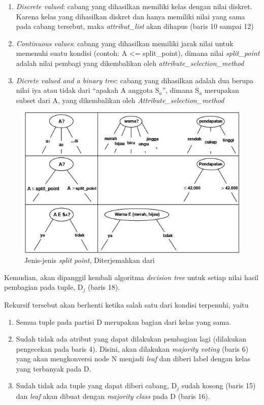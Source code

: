 \begin{enumerate}
	\item \textsl{Discrete valued}: cabang yang dihasilkan memiliki kelas dengan nilai diskret. Karena kelas yang dihasilkan diskret dan hanya memiliki nilai yang sama pada cabang tersebut, maka \textsl{attribut\_list} akan dihapus (baris 10 sampai 12)
	\item \textsl{Continuous values}: cabang yang dihasilkan memiliki jarak nilai untuk memenuhi suatu kondisi (contoh: A <= split\_point), dimana nilai \textsl{split\_point} adalah nilai pembagi yang dikembalikan oleh \textsl{attribute\_selection\_method}
	\item \textsl{Dicrete valued and a binary tree}: cabang yang dihasilkan adalah dua berupa nilai iya atau tidak dari "`apakah A anggota S$_{a}$"', dimana S$_{a}$ merupakan subset dari A, yang dikembalikan oleh \textsl{Attribute\_selection\_method}
\end{enumerate}


\begin{figure}
\centering
\includegraphics[scale=1]{Gambar/jenishasilsplitpoint.jpg}
\caption[Jenis-jenis \textsl{split point}]{Jenis-jenis \textsl{split point}, Diterjemahkan dari \cite{DM}} 
\label{fig:splitPoint}
\end{figure}

Kemudian, akan dipanggil kembali algoritma \textsl{decision tree} untuk setiap nilai hasil pembagian pada tuple, D$_{j}$  (baris 18).

Rekursif tersebut akan berhenti ketika salah satu dari kondisi terpenuhi, yaitu

\begin{enumerate}
	\item Semua tuple pada partisi D merupakan bagian dari kelas yang sama.
	\item Sudah tidak ada atribut yang dapat dilakukan pembagian lagi (dilakukan pengecekan pada baris 4). Disini, akan dilakukan \textsl{majority voting} (baris 6) yang akan mengkonversi node N menjadi \textsl{leaf} dan diberi label dengan kelas yang terbanyak pada D.
	\item Sudah tidak ada tuple yang dapat diberi cabang, D$_{j}$ sudah kosong (baris 15) dan \textsl{leaf} akan dibuat dengan \textsl{majority class} pada D (baris 16).
\end{enumerate}

